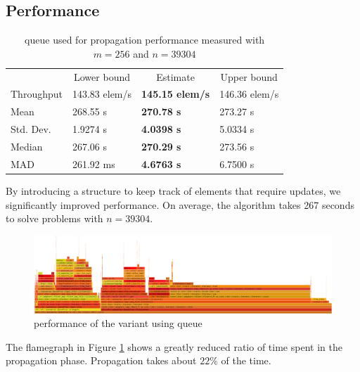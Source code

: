 \documentclass[shortabstract, english, inz]{iithesis}
\begin{document}
\subsection{Performance}
\begin{table}[]
\begin{tabular}{llll}
\multicolumn{1}{c}{} & \multicolumn{1}{c}{Lower bound} & \multicolumn{1}{c}{Estimate} & \multicolumn{1}{c}{Upper bound} \\
Throughput                      & 143.83 elem/s                & \textbf{145.15 elem/s}                   & 146.36 elem/s                   \\
Mean                            & 268.55 s                     & \textbf{270.78 s}                        & 273.27 s                        \\
Std. Dev.                       & 1.9274 s                     & \textbf{4.0398 s}                        & 5.0334 s                        \\
Median                          & 267.06 s                     & \textbf{270.29 s}                        & 273.56 s                        \\
MAD                             & 261.92 ms                    & \textbf{4.6763 s}                        & 6.7500 s
\end{tabular}
\caption{queue used for propagation performance measured with \(m=256\) and \(n=39304\)}
\label{table:queue}
\end{table}

By introducing a structure to keep track of elements that require updates, we significantly improved performance. On average, the algorithm takes 267 seconds to solve problems with \(n=39304\).

\begin{figure}[H]
\centering
\includegraphics[width=1\textwidth, angle=0]{images/queueprop_flamegraph.png}
\caption{performance of the variant using queue}
\label{fig:queueprop_flamegraph}
\end{figure}

The flamegraph in Figure \ref{fig:queueprop_flamegraph} shows a greatly reduced ratio of time spent in the propagation phase. Propagation takes about \(22\%\) of the time.
\end{document}
